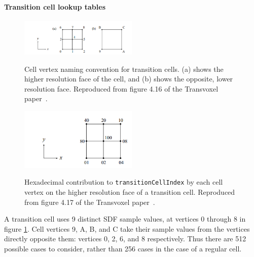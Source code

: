 \documentclass[11pt]{article}
\begin{document}
\paragraph{Transition cell lookup tables}

\begin{figure}
  \caption{Cell vertex naming convention for transition cells. (a) shows the higher resolution face of the cell, and (b) shows the opposite, lower resolution face. Reproduced from figure 4.16 of the Transvoxel paper~\cite{lengyel_2010}.}
  \includegraphics[width=0.5\textwidth]{tv_transition_labels.PNG}
  \label{fig:tv_transition_labels}
\end{figure}

\begin{figure}
  \caption{Hexadecimal contribution to \texttt{transitionCellIndex} by each cell vertex on the higher resolution face of a transition cell. Reproduced from figure 4.17 of the Transvoxel paper~\cite{lengyel_2010}.}
  \includegraphics[width=0.5\textwidth]{tv_transition_cellIndex.PNG}
  \label{fig:tv_transition_cellIndex}
\end{figure}


A transition cell uses 9 distinct SDF sample values, at vertices 0 through 8 in figure \ref{fig:tv_transition_labels}. Cell vertices 9, A, B, and C take their sample values from the vertices directly opposite them: vertices 0, 2, 6, and 8 respectively. Thus there are 512 possible cases to consider, rather than 256 cases in the case of a regular cell.
\end{document}

